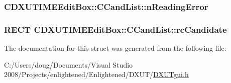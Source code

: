 \label{struct_c_d_x_u_t_i_m_e_edit_box_1_1_c_cand_list_a64a1f4e408499157b031083bdd487aff}
\hypertarget{struct_c_d_x_u_t_i_m_e_edit_box_1_1_c_cand_list_a3e9e90ede32fae394f178ec6d353ce96}{
\subsubsection[{nReadingError}]{ {\bf CDXUTIMEEditBox::CCandList::nReadingError}}}
\label{struct_c_d_x_u_t_i_m_e_edit_box_1_1_c_cand_list_a3e9e90ede32fae394f178ec6d353ce96}
\hypertarget{struct_c_d_x_u_t_i_m_e_edit_box_1_1_c_cand_list_a1156d0c172cab967842783b7a33f7d63}{
\subsubsection[{rcCandidate}]{\setlength{\rightskip}{0pt plus 5cm}RECT {\bf CDXUTIMEEditBox::CCandList::rcCandidate}}}
\label{struct_c_d_x_u_t_i_m_e_edit_box_1_1_c_cand_list_a1156d0c172cab967842783b7a33f7d63}


The documentation for this struct was generated from the following file:\begin{DoxyCompactItemize}
\item 
C:/Users/doug/Documents/Visual Studio 2008/Projects/enlightened/Enlightened/DXUT/\hyperlink{_d_x_u_tgui_8h}{DXUTgui.h}\end{DoxyCompactItemize}
